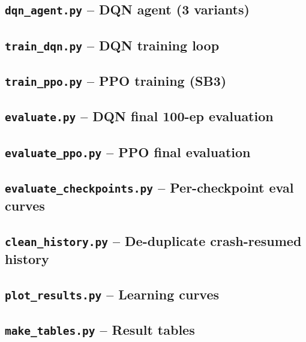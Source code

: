 \documentclass[12pt]{article}
\begin{document}
\subsection*{\texttt{dqn\_agent.py} -- DQN agent (3 variants)}


\subsection*{\texttt{train\_dqn.py} -- DQN training loop}


\subsection*{\texttt{train\_ppo.py} -- PPO training (SB3)}


\subsection*{\texttt{evaluate.py} -- DQN final 100-ep evaluation}


\subsection*{\texttt{evaluate\_ppo.py} -- PPO final evaluation}


\subsection*{\texttt{evaluate\_checkpoints.py} -- Per-checkpoint eval curves}


\subsection*{\texttt{clean\_history.py} -- De-duplicate crash-resumed history}


\subsection*{\texttt{plot\_results.py} -- Learning curves}


\subsection*{\texttt{make\_tables.py} -- Result tables}

\end{document}
